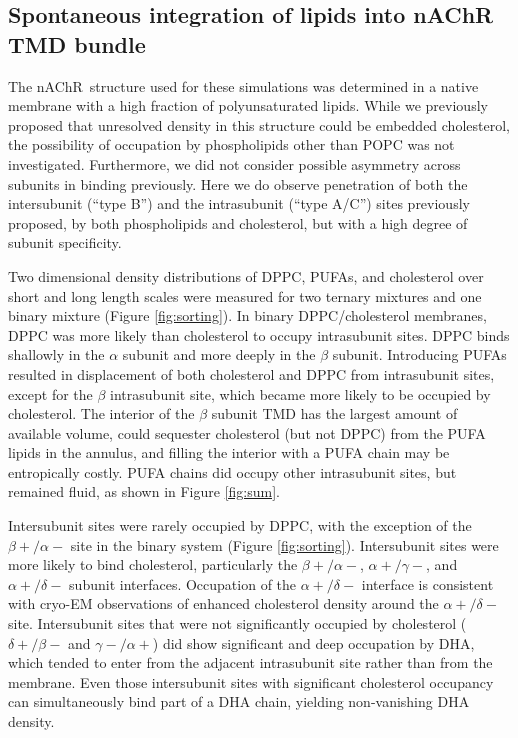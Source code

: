 \documentclass[final,3p,times,twocolumn]{elsarticle}
\newcommand{\nachr}{nAChR}
\begin{document}
	\subsection{Spontaneous integration of lipids into nAChR TMD bundle} \label{Embed}

	The \nachr~structure used for these simulations was determined in a native membrane with a high fraction of polyunsaturated lipids. While we previously \cite{Brannigan_Embedded_2008} proposed that unresolved density in this structure could be embedded cholesterol, the possibility of occupation by phospholipids other than POPC was not investigated.  Furthermore, we did not consider possible asymmetry across subunits in binding previously.  Here we do observe penetration of both the intersubunit (``type B'') and the intrasubunit (``type A/C'') sites previously proposed\cite{Brannigan_Embedded_2008}, by both phospholipids and cholesterol, but with a high degree of subunit specificity.  
		
Two dimensional density distributions of DPPC, PUFAs, and cholesterol over short and long length scales were measured for two ternary mixtures and one binary mixture (Figure \ref{fig:sorting}).   In binary DPPC/cholesterol membranes, DPPC was more likely than cholesterol to occupy intrasubunit sites.  DPPC binds shallowly in the $\alpha$ subunit and more deeply in the $\beta$ subunit. Introducing PUFAs resulted in displacement of both cholesterol and DPPC from intrasubunit sites, except for the $\beta$ intrasubunit site, which became more likely to be occupied by cholesterol. The interior of the $\beta$ subunit TMD has the largest amount of available volume, could sequester cholesterol (but not DPPC) from the PUFA lipids in the annulus, and filling the interior with a PUFA chain may be entropically costly.  PUFA chains did occupy other intrasubunit sites, but remained fluid, as shown in Figure \ref{fig:sum}. 

	Intersubunit sites were rarely occupied by DPPC, with the exception of the $\beta+/\alpha-$ site in the binary system (Figure \ref{fig:sorting}). Intersubunit sites were more likely to bind cholesterol, particularly the $\beta+/\alpha-$, $\alpha+/\gamma-$, and $\alpha+/\delta-$ subunit interfaces. Occupation of the $\alpha+/\delta-$ interface is consistent with cryo-EM observations\cite{Unwin_Segregation_2017}  of enhanced cholesterol density around the $\alpha+/\delta-$ site. Intersubunit sites that were not significantly occupied by cholesterol ($\delta+/\beta-$ and $\gamma-/\alpha+$) did show significant and deep occupation by DHA, which tended to enter from the adjacent intrasubunit site rather than from the membrane. Even those intersubunit sites with significant cholesterol occupancy can simultaneously bind part of a DHA chain, yielding non-vanishing DHA density.  
\end{document}
